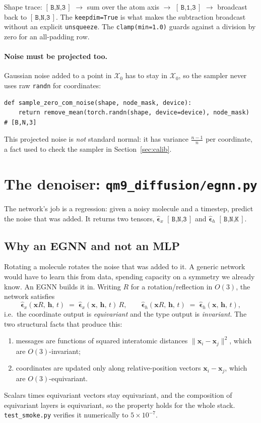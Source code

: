 \documentclass[11pt,a4paper]{article}
\newcommand{\shape}[1]{\ensuremath{[\,\texttt{#1}\,]}}
\newcommand{\code}[1]{\texttt{#1}}
\newcommand{\bx}{\mathbf{x}}
\newcommand{\bh}{\mathbf{h}}
\newcommand{\bm}{\boldsymbol{\epsilon}}
\newcommand{\file}[1]{\textcolor{BlueLink}{\texttt{#1}}}
\begin{document}
\noindent
Shape trace: \shape{B,N,3} $\to$ sum over the atom axis $\to$ \shape{B,1,3}
$\to$ broadcast back to \shape{B,N,3}. The \code{keepdim=True} is what makes the
subtraction broadcast without an explicit \code{unsqueeze}. The
\code{clamp(min=1.0)} guards against a division by zero for an all-padding row.

\paragraph{Noise must be projected too.} Gaussian noise added to a point in
$\mathcal{X}_0$ has to stay in $\mathcal{X}_0$, so the sampler never uses raw
\code{randn} for coordinates:
\begin{lstlisting}
def sample_zero_com_noise(shape, node_mask, device):
    return remove_mean(torch.randn(shape, device=device), node_mask)   # [B,N,3]
\end{lstlisting}
This projected noise is \emph{not} standard normal: it has variance
$\tfrac{n-1}{n}$ per coordinate, a fact used to check the sampler in
Section~\ref{sec:calib}.

\section{The denoiser: \file{qm9\_diffusion/egnn.py}}
\label{sec:egnn}

The network's job is a regression: given a noisy molecule and a timestep,
predict the noise that was added. It returns two tensors,
$\hat{\bm}_x$ \shape{B,N,3} and $\hat{\bm}_h$ \shape{B,N,K}.

\subsection{Why an EGNN and not an MLP}

Rotating a molecule rotates the noise that was added to it. A generic network
would have to learn this from data, spending capacity on a symmetry we already
know. An EGNN builds it in. Writing $R$ for a rotation/reflection in $O(3)$, the
network satisfies
\begin{equation}
  \hat{\bm}_x(\bx R,\,\bh,\,t) \;=\; \hat{\bm}_x(\bx,\,\bh,\,t)\,R,
  \qquad
  \hat{\bm}_h(\bx R,\,\bh,\,t) \;=\; \hat{\bm}_h(\bx,\,\bh,\,t),
\end{equation}
i.e.\ the coordinate output is \emph{equivariant} and the type output is
\emph{invariant}. The two structural facts that produce this:
\begin{enumerate}[leftmargin=1.6em]
  \item messages are functions of squared interatomic distances
        $\lVert \bx_i-\bx_j\rVert^2$, which are $O(3)$-invariant;
  \item coordinates are updated only along relative-position vectors
        $\bx_i-\bx_j$, which are $O(3)$-equivariant.
\end{enumerate}
Scalars times equivariant vectors stay equivariant, and the composition of
equivariant layers is equivariant, so the property holds for the whole stack.
\code{test\_smoke.py} verifies it numerically to $5\times10^{-7}$.
\end{document}
